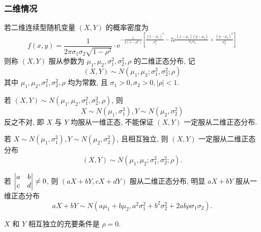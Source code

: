 \subsubsection{二维情况}

\begin{definition}[二维正态分布]
    若二维连续型随机变量 $ (X, Y) $ 的概率密度为
    $$f(x,y)=\frac{1}{2 \pi \sigma_{1} \sigma_{2} \sqrt{1-\rho^{2}}} \cdot \mathrm{e}^{-\frac{1}{2\left(1-\rho^{2}\right)}\left[\frac{\left(x-\mu_{1}\right)^{2}}{\sigma_{1}^{2}}-2 \rho \frac{\left(x-\mu_{1}\right)\left(y-\mu_{2}\right)}{\sigma_{1} \sigma_{2}}+\frac{\left(y-\mu_{2}\right)^{2}}{\sigma_{2}^{2}}\right]}$$
    则称 $ (X, Y) $ 服从参数为 $ \mu_{1}, \mu_{2}, \sigma_{1}^{2}, \sigma_{2}^{2}, \rho $ 的二维正态分布, 
    记 $$ (X, Y) \sim N\left(\mu_{1}, \mu_{2}; \sigma_{1}^{2}, \sigma_{2}^{2}; \rho\right) $$
    其中 $ \mu_{1}, \mu_{2}, \sigma_{1}^{2}, \sigma_{2}^{2}, \rho $ 均为常数, 且 $ \sigma_{1}>0, \sigma_{2}>0,|\rho|<1 .$
\end{definition}
\begin{theorem}[二维正态分布推出一维正态分布]
    若 $ (X, Y) \sim N\left(\mu_{1}, \mu_{2}, \sigma_{1}^{2}, \sigma_{2}^{2}, \rho\right) $, 则
    $$X \sim N\left(\mu_{1}, \sigma_{1}^{2}\right), Y \sim N\left(\mu_{2}, \sigma_{2}^{2}\right)$$
    反之不对, 即 $ X $ 与 $ Y $ 均服从一维正态, 不能保证 $ (X, Y) $ 一定服从二维正态分布.
\end{theorem}

\begin{theorem}[独立一维正态分布推出二维正态分布]
    若 $ X \sim N\left(\mu_{1}, \sigma_{1}^{2}\right), Y \sim N\left(\mu_{2}, \sigma_{2}^{2}\right)$, 且相互独立, 则 $ (X, Y) $ 一定服从二维正态分布
    $$ (X, Y) \sim N\left(\mu_{1}, \mu_{2}; \sigma_{1}^{2}, \sigma_{2}^{2}; \rho\right) .$$
\end{theorem}

\begin{theorem}
    若 $\mqty|a&b\\c&d|\neq0$, 则 $ (a X+b Y, c X+d Y) $ 服从二维正态分布, 明显 $ a X+b Y $ 服从一维正态分布
    $$a X+b Y \sim N\left(a \mu_{1}+b \mu_{2}, a^{2} \sigma_{1}^{2}+b^{2} \sigma_{2}^{2}+2 a b \rho \sigma_{1} \sigma_{2}\right) .$$
\end{theorem}

\begin{theorem}
    $X $ 和 $ Y $ 相互独立的充要条件是 $ \rho=0 .$
\end{theorem}

